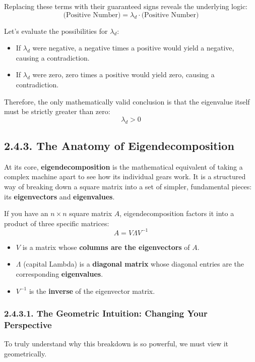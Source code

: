 \documentclass{article}
\begin{document}
Replacing these terms with their guaranteed signs reveals the underlying logic:
\[ \text{(Positive Number)} = \lambda_d \cdot \text{(Positive Number)} \]

Let's evaluate the possibilities for $\lambda_d$:
\begin{itemize}
    \item If $\lambda_d$ were negative, a negative times a positive would yield a negative, causing a contradiction.
    \item If $\lambda_d$ were zero, zero times a positive would yield zero, causing a contradiction.
\end{itemize}

Therefore, the only mathematically valid conclusion is that the eigenvalue itself must be strictly greater than zero:
\[ \lambda_d > 0 \]

\subsection*{2.4.3. The Anatomy of Eigendecomposition}

At its core, \textbf{eigendecomposition} is the mathematical equivalent of taking a complex machine apart to see how its individual gears work. It is a structured way of breaking down a square matrix into a set of simpler, fundamental pieces: its \textbf{eigenvectors} and \textbf{eigenvalues}.

If you have an $n \times n$ square matrix $A$, eigendecomposition factors it into a product of three specific matrices:
\[ A = V \Lambda V^{-1} \]

\begin{itemize}
    \item $V$ is a matrix whose \textbf{columns are the eigenvectors} of $A$.
    \item $\Lambda$ (capital Lambda) is a \textbf{diagonal matrix} whose diagonal entries are the corresponding \textbf{eigenvalues}.
    \item $V^{-1}$ is the \textbf{inverse} of the eigenvector matrix.
\end{itemize}

\subsubsection*{2.4.3.1. The Geometric Intuition: Changing Your Perspective}

To truly understand why this breakdown is so powerful, we must view it geometrically. 
\end{document}
